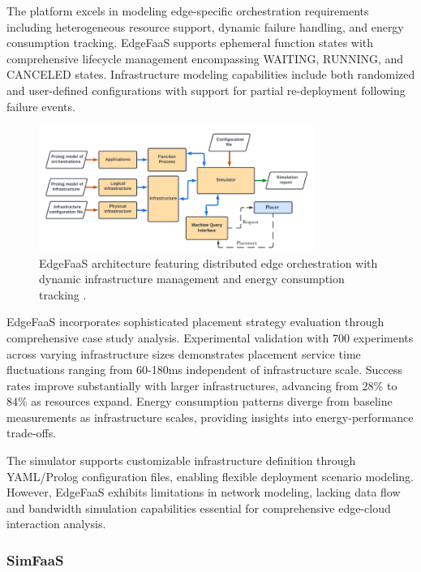 The platform excels in modeling edge-specific orchestration requirements including heterogeneous resource support, dynamic failure handling, and energy consumption tracking. EdgeFaaS supports ephemeral function states with comprehensive lifecycle management encompassing WAITING, RUNNING, and CANCELED states. Infrastructure modeling capabilities include both randomized and user-defined configurations with support for partial re-deployment following failure events.

\begin{figure}[htbp]
\centering
\includegraphics[width=0.8\textwidth]{assets/lambdacontsim.png}
\caption{EdgeFaaS architecture featuring distributed edge orchestration with dynamic infrastructure management and energy consumption tracking \cite{li2022edgefaas}.}
\label{fig:edgefaas-architecture}
\end{figure}


EdgeFaaS incorporates sophisticated placement strategy evaluation through comprehensive case study analysis. Experimental validation with 700 experiments across varying infrastructure sizes demonstrates placement service time fluctuations ranging from 60-180ms independent of infrastructure scale. Success rates improve substantially with larger infrastructures, advancing from 28\% to 84\% as resources expand. Energy consumption patterns diverge from baseline measurements as infrastructure scales, providing insights into energy-performance trade-offs.

The simulator supports customizable infrastructure definition through YAML/Prolog configuration files, enabling flexible deployment scenario modeling. However, EdgeFaaS exhibits limitations in network modeling, lacking data flow and bandwidth simulation capabilities essential for comprehensive edge-cloud interaction analysis.



\subsubsection{SimFaaS}

